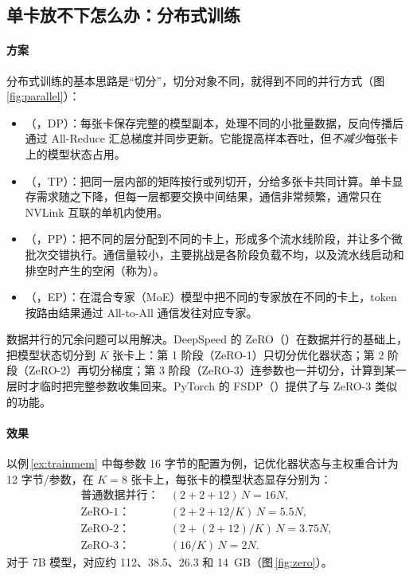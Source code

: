 \subsection{单卡放不下怎么办：分布式训练}
\label{subsec:parallel}

\paragraph{方案} 分布式训练的基本思路是“切分”，切分对象不同，就得到不同的并行方式（图\,\ref{fig:parallel}）：
\begin{itemize}
  \item {}（，DP）：每张卡保存完整的模型副本，处理不同的小批量数据，反向传播后通过 All-Reduce 汇总梯度并同步更新。它能提高样本吞吐，但\emph{不减少}每张卡上的模型状态占用。
  \item {}（，TP）：把同一层内部的矩阵按行或列切开，分给多张卡共同计算\cite{shoeybi2019megatron}。单卡显存需求随之下降，但每一层都要交换中间结果，通信非常频繁，通常只在 NVLink 互联的单机内使用。
  \item {}（，PP）：把不同的层分配到不同的卡上，形成多个流水线阶段，并让多个微批次交错执行。通信量较小，主要挑战是各阶段负载不均，以及流水线启动和排空时产生的空闲（称为）。
  \item {}（，EP）：在混合专家（MoE）模型中把不同的专家放在不同的卡上，token 按路由结果通过 All-to-All 通信发往对应专家。
\end{itemize}



数据并行的冗余问题可以用解决。DeepSpeed 的 ZeRO（）\cite{rajbhandari2020zero}在数据并行的基础上，把模型状态切分到 $K$ 张卡上：第 1 阶段（ZeRO-1）只切分优化器状态；第 2 阶段（ZeRO-2）再切分梯度；第 3 阶段（ZeRO-3）连参数也一并切分，计算到某一层时才临时把完整参数收集回来。PyTorch 的 FSDP（）提供了与 ZeRO-3 类似的功能。

\paragraph{效果} 以例\,\ref{ex:trainmem} 中每参数 16 字节的配置为例，记优化器状态与主权重合计为 12 字节/参数，在 $K=8$ 张卡上，每张卡的模型状态显存分别为：
\begin{align*}
  \text{普通数据并行：} &\ (2+2+12)\,N = 16N, \\
  \text{ZeRO-1：} &\ (2+2+12/K)\,N = 5.5N, \\
  \text{ZeRO-2：} &\ (2+(2+12)/K)\,N = 3.75N, \\
  \text{ZeRO-3：} &\ (16/K)\,N = 2N.
\end{align*}
对于 7B 模型，对应约 112、38.5、26.3 和 \SI{14}{GB}（图\,\ref{fig:zero}）。

